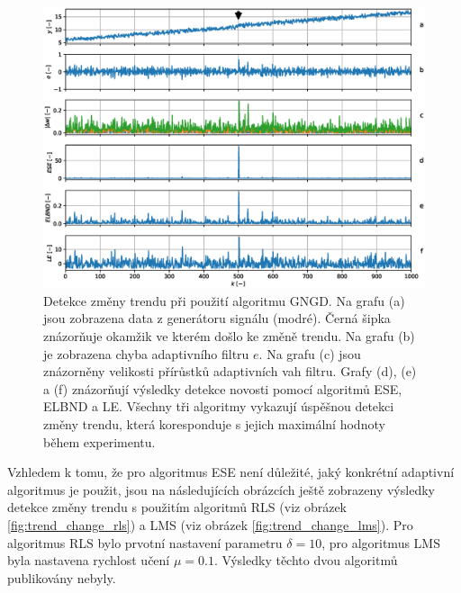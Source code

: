 \begin{figure}[ht!]

    \centering
    \includegraphics[scale=0.60]{IMG/mdpi/trendchange.eps}
    \caption{Detekce změny trendu při použití algoritmu GNGD. Na grafu (a) jsou zobrazena data z generátoru signálu (modré). Černá šipka znázorňuje okamžik ve kterém došlo ke změně trendu. Na grafu (b) je zobrazena chyba adaptivního filtru $e$. Na grafu (c) jsou znázorněny velikosti přírůstků adaptivních vah filtru. Grafy (d), (e) a (f) znázorňují výsledky detekce novosti pomocí algoritmů ESE, ELBND a LE. Všechny tři algoritmy vykazují úspěšnou detekci změny trendu, která koresponduje s jejich maximální hodnoty během experimentu.}
\label{fig:trend_change}
\end{figure}
\par
Vzhledem k tomu, že pro algoritmus ESE není důležité, jaký konkrétní adaptivní algoritmus je použit, jsou na následujících obrázcích ještě zobrazeny výsledky detekce změny trendu s použitím algoritmů RLS (viz obrázek \ref{fig:trend_change_rls}) a LMS (viz obrázek \ref{fig:trend_change_lms}). Pro algoritmus RLS bylo prvotní nastavení parametru $\delta=10$, pro algoritmus LMS byla nastavena rychlost učení $\mu=0.1$. Výsledky těchto dvou algoritmů publikovány nebyly.

